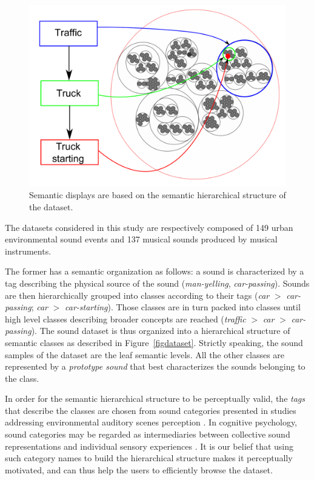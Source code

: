 \documentclass{aes2e}
\begin{document}
\begin{figure}[t]
\begin{center}
\includegraphics[scale=0.24]{gfx/SSF.pdf} 
\end{center}
\caption{\label{figSSF} Semantic displays are  based on the semantic hierarchical structure of the dataset.}
\end{figure}


The datasets considered in this study are respectively composed of 149 urban environmental sound events and 137 musical sounds produced by musical instruments. 

The former has a semantic organization as follows: a sound is characterized by a tag describing the physical source of the sound (\textit{man-yelling}, \textit{car-passing}). Sounds are then hierarchically grouped into classes according to their tags (\textit{car} $>$ \textit{car-passing}; \textit{car} $>$ \textit{car-starting}). Those classes are in turn packed into classes until high level classes describing broader concepts are reached (\textit{traffic} $>$ \textit{car} $>$ \textit{car-passing}). The sound dataset is thus organized into a hierarchical structure of semantic classes as described in Figure~\ref{figdataset}. Strictly speaking, the sound samples of the dataset are the leaf semantic levels. All the other classes are represented by a \textit{prototype sound} that best characterizes the sounds belonging to the class. 

In order for the semantic hierarchical structure to be perceptually valid, the \textit{tags} that describe the classes  are chosen from sound categories presented in studies addressing environmental auditory scenes perception \cite{niessen2010categories, brown2011towards, dubois2006cognitive}. In cognitive psychology, sound categories may be regarded as intermediaries between collective sound representations and individual sensory experiences \cite{dubois2006cognitive}. It is our belief that using such category names to build the hierarchical structure makes it perceptually motivated, and can thus help the users to efficiently browse the dataset.
\end{document}
